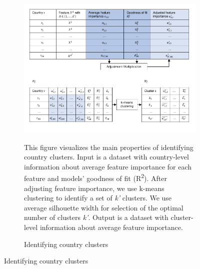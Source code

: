 \begin{figure}[ht!]\ContinuedFloat
   \begin{subfigure}[b]{\textwidth}
  \centering
  \includegraphics{1_Figures/Figures_Appendix/Graphical representation of data work_3.pdf}
  \caption{Identifying country clusters} \label{fig:data_visualisation_3}
  \begin{subcaption2}
    This figure visualizes the main properties of identifying country clusters. Input is a dataset with country-level information about average feature importance for each feature and models' goodness of fit (R\textsuperscript{2}). After adjusting feature importance, we use k-means clustering to identify a set of \textit{k'} clusters. We use average silhouette width for selection of the optimal number of clusters \textit{k'}. Output is a dataset with cluster-level information about average feature importance.
  \end{subcaption2}
\end{subfigure}
\end{figure}